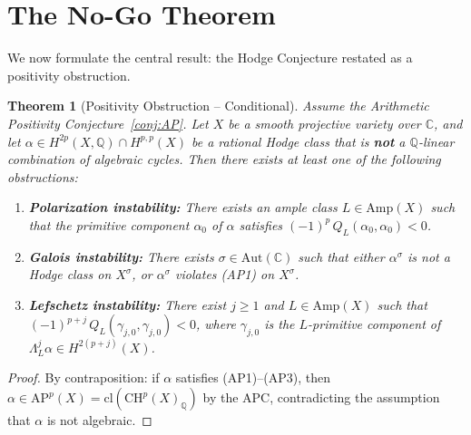 \documentclass[aps,prd,twocolumn,superscriptaddress,nofootinbib]{revtex4-2}
\newtheorem{theorem}{Theorem}[section]
\theoremstyle{definition}
\theoremstyle{remark}
\begin{document}
\section{The No-Go Theorem}
\label{sec:nogo}

We now formulate the central result: the Hodge Conjecture restated as a positivity obstruction.

\begin{theorem}[Positivity Obstruction -- Conditional]
\label{thm:nogo}
Assume the Arithmetic Positivity Conjecture~\ref{conj:AP}. Let $X$ be a smooth projective variety over $\mathbb{C}$, and let $\alpha \in H^{2p}(X, \mathbb{Q}) \cap H^{p,p}(X)$ be a rational Hodge class that is \textbf{not} a $\mathbb{Q}$-linear combination of algebraic cycles. Then there exists at least one of the following obstructions:

\begin{enumerate}
\item[\textbf{(O1)}] \textbf{Polarization instability:} There exists an ample class $L \in \mathrm{Amp}(X)$ such that the primitive component $\alpha_0$ of $\alpha$ satisfies $(-1)^p\,Q_L(\alpha_0, \alpha_0) < 0$.

\item[\textbf{(O2)}] \textbf{Galois instability:} There exists $\sigma \in \mathrm{Aut}(\mathbb{C})$ such that either $\alpha^\sigma$ is not a Hodge class on $X^\sigma$, or $\alpha^\sigma$ violates (AP1) on $X^\sigma$.

\item[\textbf{(O3)}] \textbf{Lefschetz instability:} There exist $j \geq 1$ and $L \in \mathrm{Amp}(X)$ such that $(-1)^{p+j}\,Q_L(\gamma_{j,0}, \gamma_{j,0}) < 0$, where $\gamma_{j,0}$ is the $L$-primitive component of $\Lambda_L^j \alpha \in H^{2(p+j)}(X)$.
\end{enumerate}
\end{theorem}

\begin{proof}
By contraposition: if $\alpha$ satisfies (AP1)--(AP3), then $\alpha \in \mathrm{AP}^p(X) = \mathrm{cl}(\mathrm{CH}^p(X)_\mathbb{Q})$ by the APC, contradicting the assumption that $\alpha$ is not algebraic.
\end{proof}
\end{document}
